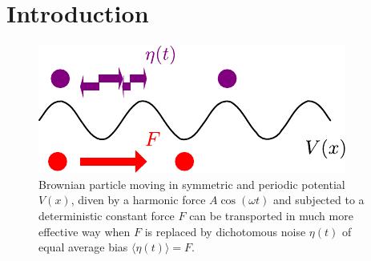 \documentclass[12pt]{iopart}
\begin{document}
\section{Introduction}
\begin{figure}[b]
	\centering
	\includegraphics[width=0.45\linewidth]{moti.pdf}
	\caption{Brownian particle moving in 
	symmetric and periodic potential $V(x)$, diven by a harmonic force $A\cos{(\omega t)}$ 
	and subjected to a deterministic constant force $F$ can be transported in much more
	effective way when $F$ is replaced by dichotomous noise $\eta(t)$ of equal average bias
	$\langle \eta(t) \rangle = F$.}
	\label{moti}
\end{figure}
\end{document}
